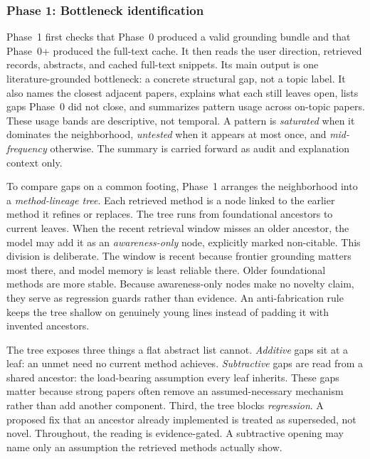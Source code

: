 \documentclass[10pt,a4paper]{article}
\begin{document}
\subsubsection{Phase 1: Bottleneck identification}

Phase~1 first checks that Phase~0 produced a valid grounding bundle and that Phase~0+ produced the full-text cache. It then reads the user direction, retrieved records, abstracts, and cached full-text snippets. Its main output is one literature-grounded bottleneck: a concrete structural gap, not a topic label. It also names the closest adjacent papers, explains what each still leaves open, lists gaps Phase~0 did not close, and summarizes pattern usage across on-topic papers. These usage bands are descriptive, not temporal. A pattern is \emph{saturated} when it dominates the neighborhood, \emph{untested} when it appears at most once, and \emph{mid-frequency} otherwise. The summary is carried forward as audit and explanation context only.

To compare gaps on a common footing, Phase~1 arranges the neighborhood into a \emph{method-lineage tree}. Each retrieved method is a node linked to the earlier method it refines or replaces. The tree runs from foundational ancestors to current leaves. When the recent retrieval window misses an older ancestor, the model may add it as an \emph{awareness-only} node, explicitly marked non-citable. This division is deliberate. The window is recent because frontier grounding matters most there, and model memory is least reliable there. Older foundational methods are more stable. Because awareness-only nodes make no novelty claim, they serve as regression guards rather than evidence. An anti-fabrication rule keeps the tree shallow on genuinely young lines instead of padding it with invented ancestors.

The tree exposes three things a flat abstract list cannot. \emph{Additive} gaps sit at a leaf: an unmet need no current method achieves. \emph{Subtractive} gaps are read from a shared ancestor: the load-bearing assumption every leaf inherits. These gaps matter because strong papers often remove an assumed-necessary mechanism rather than add another component. Third, the tree blocks \emph{regression}. A proposed fix that an ancestor already implemented is treated as superseded, not novel. Throughout, the reading is evidence-gated. A subtractive opening may name only an assumption the retrieved methods actually show.
\end{document}
